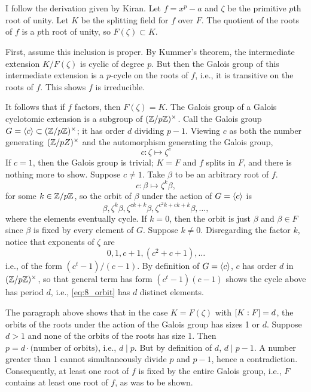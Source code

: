 \documentclass[12pt]{article}
\begin{document}
\section{} 
\subsection{} 
I follow the derivation given by Kiran. 
Let $f = x^p - a$ and $\zeta$ be the primitive $p$th root of unity. 
Let $K$ be the splitting field for $f$ over $F$. 
The quotient of the roots of $f$ is a $p$th root of unity, so $F(\zeta) \subset K$. 

First, assume this inclusion is proper. 
By Kummer's theorem, the intermediate extension $K / F(\zeta)$ is cyclic of degree $p$. 
But then the Galois group of this intermediate extension is a $p$-cycle on the roots of $f$, i.e., it is transitive on the roots of $f$. 
This shows $f$ is irreducible. 

It follows that if $f$ factors, then $F(\zeta) = K$. 
The Galois group of a Galois cyclotomic extension is a subgroup of $(\mathbb{Z} / p\mathbb{Z})^\times$. 
Call the Galois group $G = \langle c\rangle \subset (\mathbb{Z} / p\mathbb{Z})^\times$; 
it has order $d$ dividing $p - 1$. 
Viewing $c$ as both the number generating $(\mathbb{Z} / pZ)^\times$ and the automorphism generating the Galois group, 
$$c: \zeta \mapsto \zeta^{c}$$
If $c = 1$, then the Galois group is trivial; 
$K = F$ and $f$ splits in $F$, and there is nothing more to show. 
Suppose $c \neq 1$. 
Take $\beta$ to be an arbitrary root of $f$. 
$$c: \beta \mapsto \zeta^k \beta,$$
for some $k \in \mathbb{Z}/p\mathbb{Z}$, so the orbit of $\beta$ under the action of $G = \langle c\rangle$ is 
\begin{equation} \label{eq:8_orbit} 
  \beta, \zeta^k \beta, \zeta^{ck + k} \beta, \zeta^{c^2 k + ck + k} \beta, \ldots,
\end{equation}
where the elements eventually cycle. 
If $k = 0$, then the orbit is just $\beta$ and $\beta \in F$ since $\beta$ is fixed by every element of $G$. 
Suppose $k \neq 0$. 
Disregarding the factor $k$, notice that exponents of $\zeta$ are 
$$0, 1, c + 1, (c^2 + c + 1), \ldots$$
i.e., of the form $(c^t - 1)/(c - 1)$. 
By definition of $G = \langle c\rangle$, $c$ has order $d$ in $(\mathbb{Z} / p\mathbb{Z})^\times$, so that general term has form $(c^t - 1)(c - 1)$ shows the cycle above has period $d$, 
i.e., \eqref{eq:8_orbit} has $d$ distinct elements. 

The paragraph above shows that in the case $K = F(\zeta)$ with $[K : F] = d$, the orbits of the roots under the action of the Galois group has sizes 1 or $d$. 
Suppose $d > 1$ and none of the orbits of the roots has size 1. 
Then $p = d \cdot (\text{number of orbits)}$, i.e., $d \mid p$. 
But by definition of $d$, $d \mid p - 1$. 
A number greater than 1 cannot simultaneously divide $p$ and $p - 1$, hence a contradiction. 
Consequently, at least one root of $f$ is fixed by the entire Galois group, i.e., 
$F$ contains at least one root of $f$, as was to be shown. 
\end{document}
